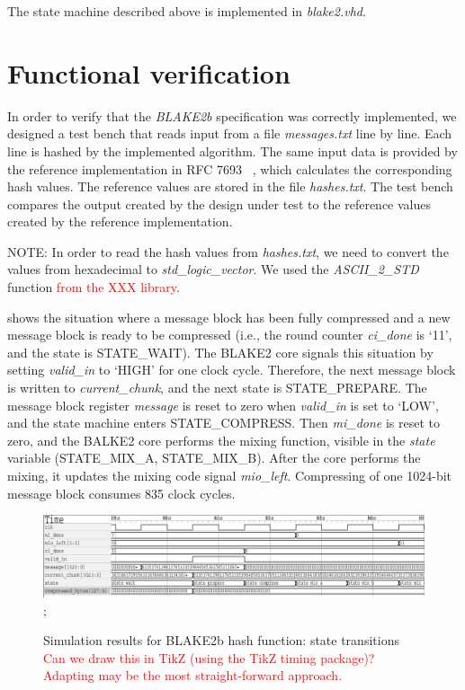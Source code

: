 \documentclass[%
	a4paper,
]
{article}
\newcommand{\todo}[1]{\textcolor{red}{#1}}
\begin{document}
\noindent
The state machine described above is implemented in \emph{blake2.vhd}.
%
%
\section{Functional verification}
\label{sec:functional-verification}

In order to verify that the \emph{BLAKE2b} specification was correctly
implemented, we designed a test bench that reads input from a file
\emph{messages.txt} line by line.
%
Each line is hashed by the implemented algorithm. The same input
data is provided by the reference implementation in RFC 7693~%
\autocite{rfc7693}, which calculates the corresponding hash values. The
reference values are stored in the file \emph{hashes.txt}.
%
The test bench compares the output created by the design under test to
the reference values created by the reference implementation.
%

NOTE: In order to read the hash values from \emph{hashes.txt}, we need to
convert the values from hexadecimal to \emph{std_logic_vector}. We used the
\emph{ASCII_2_STD} function \todo{from the XXX library}.

 shows the situation where a message block has been fully
compressed and a new message block is ready to be compressed (i.e., the round
counter \emph{ci_done} is `11', and the state is \mbox{STATE_WAIT}).
%
The BLAKE2 core signals this situation by setting \emph{valid_in} to `HIGH'
for one clock cycle.
%
Therefore, the next message block is written to \emph{current_chunk}, and the
next state is \mbox{STATE_PREPARE}. The message block register \emph{message}
is reset to zero when \emph{valid_in} is set to `LOW', and the state machine
enters \mbox{STATE_COMPRESS}.
%
Then \emph{mi_done} is reset to zero, and the BALKE2 core performs the mixing
function, visible in the \emph{state} variable (\mbox{STATE_MIX_A},
\mbox{STATE_MIX_B}). After the core performs the mixing, it updates the mixing
code signal \emph{mio\_left}.
%
Compressing of one 1024-bit message block consumes 835 clock cycles.

\begin{figure}[tb]
	\centering
	\includegraphics[width=\textwidth]{waveform2.eps};
	\caption{Simulation results for BLAKE2b hash function: state transitions
		\todo{Can we draw this in TikZ (using the TikZ timing package)? Adapting
			\Cref{fig:timing} may be the most straight-forward approach.}}
	\label{fig:signaling}
\end{figure}
\end{document}
